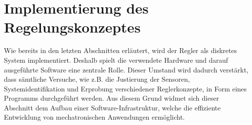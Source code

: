 \ifx\FORMAT\undefined


\fi

\chapter{Implementierung des Regelungskonzeptes}\label{chapter_SW}
Wie bereits in den letzten Abschnitten erläutert, wird der Regler als diskretes System implementiert. Deshalb spielt die verwendete Hardware und darauf ausgeführte Software eine zentrale Rolle. Dieser Umstand wird dadurch verstärkt, dass sämtliche Versuche, wie z.B. die Justierung der Sensoren, Systemidentifikation und Erprobung verschiedener Reglerkonzepte, in Form eines Programms durchgeführt werden. Aus diesem Grund widmet sich dieser Abschnitt dem Aufbau einer Software-Infrastruktur, welche die effiziente Entwicklung von mechatronischen Anwendungen ermöglicht.

\newpage

\newpage

\newpage

\newpage

\newpage

\newpage


\ifx\FORMAT\undefined

\fi